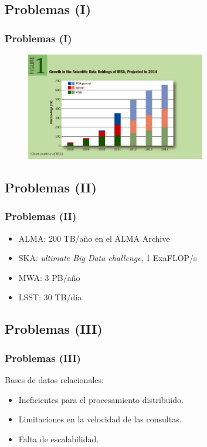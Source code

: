 \documentclass[serif,12pt]{beamer}
\begin{document}
\subsection{Problemas (I)}

\begin{frame}
\frametitle{Problemas (I)}

\begin{figure}
\centering
\includegraphics[width=0.7\textwidth, height=0.7\textheight]{images/data_rates.png} 
\label{fig:data_rates}
\end{figure}


\end{frame}
\subsection{Problemas (II)}

\begin{frame}
\frametitle{Problemas (II)}

\begin{itemize}
\item ALMA: 200 TB/año en el ALMA Archive
\item SKA: \emph{ultimate Big Data challenge}, 1 ExaFLOP/s
\item MWA: 3 PB/año
\item LSST: 30 TB/día
\end{itemize}


\end{frame}
\subsection{Problemas (III)}

\begin{frame}
\frametitle{Problemas (III)}

Bases de datos relacionales:\newline
\begin{itemize}
\item Ineficientes para el procesamiento distribuido.
\item Limitaciones en la velocidad de las consultas.
\item Falta de escalabilidad.
\end{itemize}


\end{frame}
\end{document}
